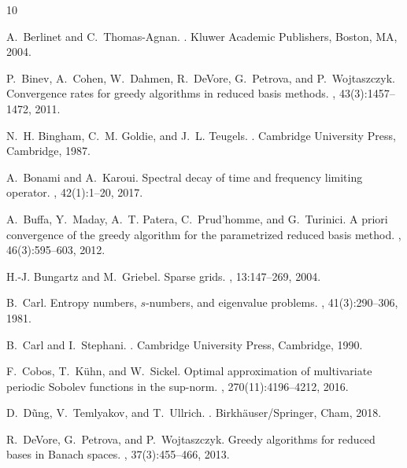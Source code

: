 \documentclass[11pt,reqno, a4paper]{article}
\numberwithin{equation}{section}
\begin{document}

\begin{thebibliography}{10}

A.~Berlinet and C.~Thomas-Agnan.
.
\newblock Kluwer Academic Publishers, Boston, MA, 2004.

P.~Binev, A.~Cohen, W.~Dahmen, R.~DeVore, G.~Petrova, and P.~Wojtaszczyk.
\newblock Convergence rates for greedy algorithms in reduced basis methods.
, 43(3):1457--1472, 2011.

N.~H. Bingham, C.~M. Goldie, and J.~L. Teugels.
.
\newblock Cambridge University Press, Cambridge, 1987.

A.~Bonami and A.~Karoui.
\newblock Spectral decay of time and frequency limiting operator.
, 42(1):1--20, 2017.

A.~Buffa, Y.~Maday, A.~T. Patera, C.~Prud'homme, and G.~Turinici.
\newblock A priori convergence of the greedy algorithm for the parametrized
  reduced basis method.
,
  46(3):595--603, 2012.

H.-J. Bungartz and M.~Griebel.
\newblock Sparse grids.
, 13:147--269, 2004.

B.~Carl.
\newblock Entropy numbers, {$s$}-numbers, and eigenvalue problems.
, 41(3):290--306, 1981.

B.~Carl and I.~Stephani.
.
\newblock Cambridge University Press, Cambridge, 1990.

F.~Cobos, T.~K\"{u}hn, and W.~Sickel.
\newblock Optimal approximation of multivariate periodic {S}obolev functions in
  the sup-norm.
, 270(11):4196--4212, 2016.

D.~D\~{u}ng, V.~Temlyakov, and T.~Ullrich.
.
\newblock Birkh\"{a}user/Springer, Cham, 2018.

R.~DeVore, G.~Petrova, and P.~Wojtaszczyk.
\newblock Greedy algorithms for reduced bases in {Banach} spaces.
, 37(3):455--466, 2013.


\end{thebibliography}
\end{document}
